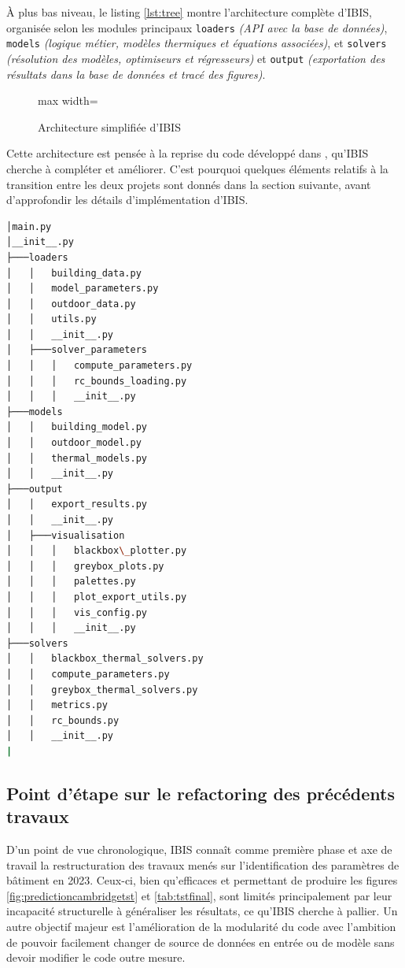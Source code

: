     À plus bas niveau, le listing \ref{lst:tree} montre l'architecture complète d'IBIS, organisée selon les modules principaux \texttt{loaders} \textit{(API avec la base de données)},
    \texttt{models} \textit{(logique métier, modèles thermiques et équations associées)}, et \texttt{solvers} \textit{(résolution des modèles, optimiseurs et régresseurs)} et \texttt{output} \textit{(exportation des résultats dans la base de données et tracé des figures)}.

    \begin{figure}[H]
        \centering
        \begin{adjustbox}{max width=\textwidth}
            {\fbox{
                
            }}
        \end{adjustbox}
        \caption{Architecture simplifiée d'IBIS}\label{fig:IBIS_archi}
    \end{figure}

    Cette architecture est pensée à la reprise du code développé dans \cite{TST}, qu'IBIS cherche à compléter et améliorer.
    C'est pourquoi quelques éléments relatifs à la transition entre les deux projets sont donnés dans la section suivante, avant d'approfondir les détails d'implémentation d'IBIS\@.

\begin{lstlisting}[language=bash, caption={Arborescence du code source d'IBIS},label={lst:tree}]
│main.py
│__init__.py
├───loaders
│   │   building_data.py
│   │   model_parameters.py
│   │   outdoor_data.py
│   │   utils.py
│   │   __init__.py
│   ├───solver_parameters
│   │   │   compute_parameters.py
│   │   │   rc_bounds_loading.py
│   │   │   __init__.py
├───models
│   │   building_model.py
│   │   outdoor_model.py
│   │   thermal_models.py
│   │   __init__.py
├───output
│   │   export_results.py
│   │   __init__.py
│   ├───visualisation
│   │   │   blackbox\_plotter.py
│   │   │   greybox_plots.py
│   │   │   palettes.py
│   │   │   plot_export_utils.py
│   │   │   vis_config.py
│   │   │   __init__.py
├───solvers
│   │   blackbox_thermal_solvers.py
│   │   compute_parameters.py
│   │   greybox_thermal_solvers.py
│   │   metrics.py
│   │   rc_bounds.py
│   │   __init__.py
|\end{lstlisting}

    \subsection{Point d'étape sur le refactoring des précédents travaux}\label{subsec:refactoring-des-precedents-travaux}
        D'un point de vue chronologique, IBIS connaît comme première phase et axe de travail la restructuration des travaux menés sur l'identification des paramètres de bâtiment en 2023.
        Ceux-ci, bien qu'efficaces et permettant de produire les figures \ref{fig:predictioncambridgetst} et \ref{tab:tstfinal}, sont limités principalement par leur incapacité structurelle à généraliser les résultats, ce qu'IBIS cherche à pallier.
        Un autre objectif majeur est l'amélioration de la modularité du code avec l'ambition de pouvoir facilement changer de source de données en entrée ou de modèle sans devoir modifier le code outre mesure.

